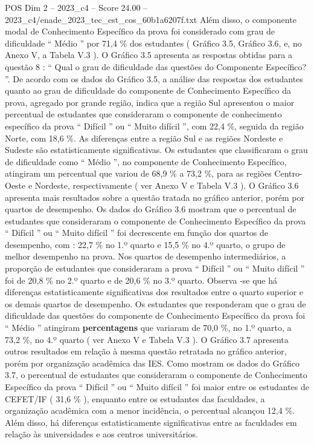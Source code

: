 \begin{textsample}{POS Dim 2 – 2023\_c4 – Score 24.00 – 2023\_c4/enade\_2023\_tec\_est\_cos\_60b1a6207f.txt}
Além disso, o componente modal de Conhecimento Específico da prova foi considerado com grau de dificuldade “ Médio ” por 71,4 \% dos estudantes ( Gráfico 3.5, Gráfico 3.6, e, no Anexo V, a Tabela V.3 ).
O Gráfico 3.5 apresenta as respostas obtidas para a questão 8 : “ Qual o grau de dificuldade das questões do Componente Específico? ”.
De acordo com os dados do Gráfico 3.5, a análise das respostas dos estudantes quanto ao grau de dificuldade do componente de Conhecimento Específico da prova, agregado por grande região, indica que a região Sul apresentou o maior percentual de estudantes que consideraram o componente de conhecimento específico da prova “ Difícil ” ou “ Muito difícil ”, com 22,4 \%, seguida da região Norte, com 18,6 \%.
As diferenças entre a região Sul e as regiões Nordeste e Sudeste são estatisticamente significativas.
Os estudantes que classificaram o grau de dificuldade como “ Médio ”, no componente de Conhecimento Específico, atingiram um percentual que variou de 68,9 \% a 73,2 \%, para as regiões Centro-Oeste e Nordeste, respectivamente ( ver Anexo V e Tabela V.3 ).
O Gráfico 3.6 apresenta mais resultados sobre a questão tratada no gráfico anterior, porém por quartos de desempenho.
Os dados do Gráfico 3.6 mostram que o percentual de estudantes que consideraram o componente de Conhecimento Específico da prova “ Difícil ” ou “ Muito difícil ” foi decrescente em função dos quartos de desempenho, com : 22,7 \% no 1.º quarto e 15,5 \% no 4.º quarto, o grupo de melhor desempenho na prova.
Nos quartos de desempenho intermediários, a proporção de estudantes que consideraram a prova “ Difícil ” ou “ Muito difícil ” foi de 20,8 \% no 2.º quarto e de 20,6 \% no 3.º quarto.
Observa -se que há diferenças estatisticamente significativas dos resultados entre o quarto superior e os demais quartos de desempenho.
Os estudantes que responderam que o grau de dificuldade das questões do componente de Conhecimento Específico da prova foi “ Médio ” atingiram \textbf{percentagens} que variaram de 70,0 \%, no 1.º quarto, a 73,2 \%, no 4.º quarto ( ver Anexo V e Tabela V.3 ).
O Gráfico 3.7 apresenta outros resultados em relação à mesma questão retratada no gráfico anterior, porém por organização acadêmica das IES.
Como mostram os dados do Gráfico 3.7, o percentual de estudantes que consideraram o componente de Conhecimento Específico da prova “ Difícil ” ou “ Muito difícil ” foi maior entre os estudantes de CEFET/IF ( 31,6 \% ), enquanto entre os estudantes das faculdades, a organização acadêmica com a menor incidência, o percentual alcançou 12,4 \%.
Além disso, há diferenças estatisticamente significativas entre as faculdades em relação às universidades e aos centros universitários.

\end{textsample}

